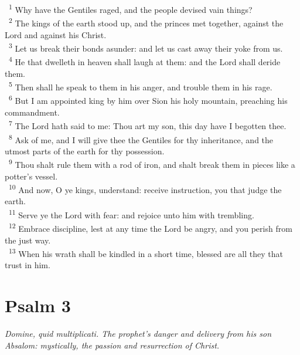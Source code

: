 \documentclass[a5paper,12pt]{article}
\begin{document}
\begin{multicols*}{2}
~\textsuperscript{1} Why have the Gentiles raged, and the people devised vain things?\\
~\textsuperscript{2} The kings of the earth stood up, and the princes met together, against the Lord and against his Christ.\\
~\textsuperscript{3} Let us break their bonds asunder: and let us cast away their yoke from us.\\
~\textsuperscript{4} He that dwelleth in heaven shall laugh at them: and the Lord shall deride them.\\
~\textsuperscript{5} Then shall he speak to them in his anger, and trouble them in his rage.\\
~\textsuperscript{6} But I am appointed king by him over Sion his holy mountain, preaching his commandment.\\
~\textsuperscript{7} The Lord hath said to me: Thou art my son, this day have I begotten thee.\\
~\textsuperscript{8} Ask of me, and I will give thee the Gentiles for thy inheritance, and the utmost parts of the earth for thy possession.\\
~\textsuperscript{9} Thou shalt rule them with a rod of iron, and shalt break them in pieces like a potter's vessel.\\
~\textsuperscript{10} And now, O ye kings, understand: receive instruction, you that judge the earth.\\
~\textsuperscript{11} Serve ye the Lord with fear: and rejoice unto him with trembling.\\
~\textsuperscript{12} Embrace discipline, lest at any time the Lord be angry, and you perish from the just way.\\
~\textsuperscript{13} When his wrath shall be kindled in a short time, blessed are all they that trust in him.\\

\section{Psalm 3}
\label{sec:org19c0e01}
\emph{Domine, quid multiplicati. The prophet's danger and delivery from his son Absalom: mystically, the passion and resurrection of Christ.}\\


\end{multicols*}
\end{document}
